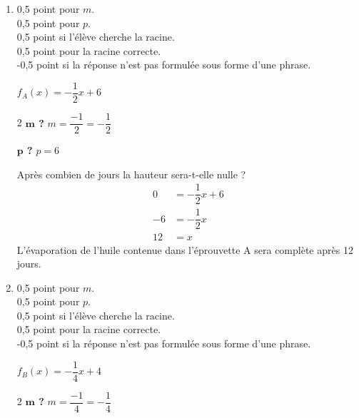\documentclass[a4paper, 12pt, parskip=half-]{scrartcl}
\begin{document}
\begin{solution}
    \begin{enumerate}
        \item 0,5 point pour $m$.\\
              0,5 point pour $p$.\\
              0,5 point si l'élève cherche la racine.\\
              0,5 point pour la racine correcte.\\
              -0,5 point si la réponse n'est pas formulée sous forme d'une phrase.

              $f_A(x) = -\dfrac{1}{2}x + 6$
              \begin{multicols}{2}
                  \textbf{$\bm{m}$ ?}
                  \medbreak
                  $m=\dfrac{-1}{2}=-\dfrac{1}{2}$
                  \columnbreak

                  \textbf{$\bm{p}$ ?}
                  \medbreak
                  $p=6$
              \end{multicols}
              Après combien de jours la hauteur sera-t-elle nulle ?
              \begin{align*}
                  0  & = -\dfrac{1}{2}x + 6 \\
                  -6 & = -\dfrac{1}{2}x     \\
                  12 & = x
              \end{align*}
              L'évaporation de l'huile contenue dans l'éprouvette A sera complète après 12 jours.
        \item 0,5 point pour $m$.\\
              0,5 point pour $p$.\\
              0,5 point si l'élève cherche la racine.\\
              0,5 point pour la racine correcte.\\
              -0,5 point si la réponse n'est pas formulée sous forme d'une phrase.

              $f_B(x)=-\dfrac{1}{4}x + 4$
              \begin{multicols}{2}
                  \textbf{$\bm{m}$ ?}
                  \medbreak
                  $m=\dfrac{-1}{4}=-\dfrac{1}{4}$
                  \columnbreak


\end{multicols}
\end{enumerate}
\end{solution}
\end{document}
